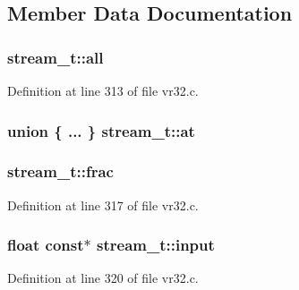 \subsection{Member Data Documentation}
\subsubsection[{\texorpdfstring{all}{all}}]{ stream\+\_\+t\+::all}\hypertarget{structstream__t_a307812623a233a3b4daee8286f003f43}{}\label{structstream__t_a307812623a233a3b4daee8286f003f43}


Definition at line 313 of file vr32.\+c.

\subsubsection[{\texorpdfstring{at}{at}}]{\setlength{\rightskip}{0pt plus 5cm}union \{ ... \}   stream\+\_\+t\+::at}\hypertarget{structstream__t_aed28aebc2f1b1852f1e50431a19f9199}{}\label{structstream__t_aed28aebc2f1b1852f1e50431a19f9199}
\subsubsection[{\texorpdfstring{frac}{frac}}]{ stream\+\_\+t\+::frac}\hypertarget{structstream__t_a85ea5c6882b4dc232f1b496ebe25925c}{}\label{structstream__t_a85ea5c6882b4dc232f1b496ebe25925c}


Definition at line 317 of file vr32.\+c.

\subsubsection[{\texorpdfstring{input}{input}}]{\setlength{\rightskip}{0pt plus 5cm}float {\bf const}$\ast$ stream\+\_\+t\+::input}\hypertarget{structstream__t_a5fe10cfa36256c38bfad0da6120769d8}{}\label{structstream__t_a5fe10cfa36256c38bfad0da6120769d8}


Definition at line 320 of file vr32.\+c.

